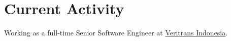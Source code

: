 \section{Current Activity}

Working as a full-time Senior Software Engineer at \href{http://www.veritrans.co.id}{Veritrans Indonesia}.

